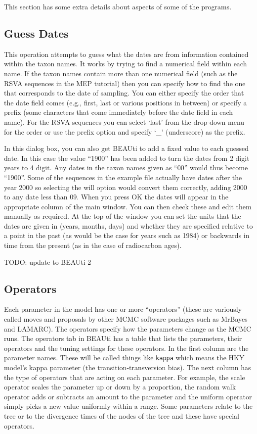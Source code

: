 \documentclass[11pt]{article}
\theoremstyle{plain}%
\theoremstyle{definition}
\theoremstyle{remark}
\begin{document}
This section has some extra details about aspects of some of the programs.

\subsection*{Guess Dates}

This operation attempts to guess what the dates are from information contained within the taxon names. It works by trying to
find a numerical field within each name. If the taxon names contain more than one numerical field (such as the RSVA
sequences in the MEP tutorial) then you can specify how to find the one that corresponds to the date of sampling. You can either
specify the order that the date field comes (e.g., first, last or various positions in between) or specify a prefix (some
characters that come immediately before the date field in each name). For the RSVA sequences you can select `last' from
the drop-down menu for the order or use the prefix option and specify `\_' (underscore) as the prefix.

In this dialog box, you can also get BEAUti to add a fixed value to each guessed date. In this case the value ``1900'' has
been added to turn the dates from 2 digit years to 4 digit. Any dates in the taxon names given as ``00'' would thus become
``1900''. Some of the sequences in the example file actually have dates after the year 2000 so selecting the will option would
convert them correctly, adding 2000 to any date less than 09. When you press OK the dates will appear in the appropriate
column of the main window. You can then check these and edit them manually as required. At the top of the window you
can set the units that the dates are given in (years, months, days) and whether they are specified relative to a point in the
past (as would be the case for years such as 1984) or backwards in time from the present (as in the case of radiocarbon
ages).

 TODO: update to BEAUti 2
\subsection*{Operators}
Each parameter in the model has one or more ``operators'' (these are variously called moves and proposals by other MCMC
software packages such as MrBayes and LAMARC). The operators specify how the parameters change as the MCMC runs.
The operators tab in BEAUti has a table that lists the parameters, their operators and the tuning settings for these operators.
In the first column are the parameter names. These will be called things like \texttt{kappa} which means the HKY model's
kappa parameter (the transition-transversion bias). The next column has the type of operators that are acting on each
parameter. For example, the scale operator scales the parameter up or down by a proportion, the random walk operator
adds or subtracts an amount to the parameter and the uniform operator simply picks a new value uniformly within a range.
Some parameters relate to the tree or to the divergence times of the nodes of the tree and these have special operators.
\end{document}
